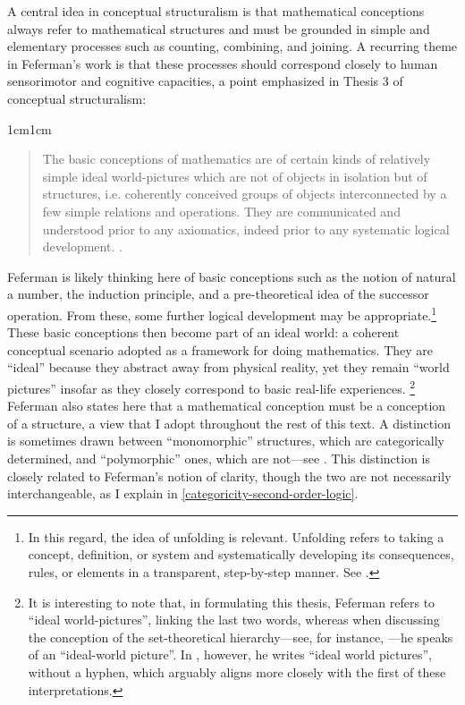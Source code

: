 \documentclass[11pt,a4paper]{article}
\theoremstyle{plain}
\begin{document}
A central idea in conceptual structuralism is that mathematical conceptions always refer to mathematical structures and must be grounded in simple and elementary processes such as counting, combining, and joining. A recurring theme in Feferman's work is that these processes should correspond closely to human sensorimotor and cognitive capacities, a point emphasized in Thesis 3 of conceptual structuralism:

\begin{adjustwidth}{1cm}{1cm}
\begin{quote}
\small
The basic conceptions of mathematics are of certain kinds of relatively simple ideal world-pictures which are not of objects in isolation but of structures, i.e. coherently conceived groups of objects interconnected by a few simple relations and operations. They are communicated and understood prior to any axiomatics, indeed prior to any systematic logical development. \parencite[p. 11]{Feferman2011a}.
\end{quote}
\end{adjustwidth}

Feferman is likely thinking here of basic conceptions such as the notion of natural a number, the induction principle, and a pre-theoretical idea of the successor operation. From these, some further logical development may be appropriate.\footnote{In this regard, the idea of unfolding is relevant. Unfolding refers to taking a concept, definition, or system and systematically developing its consequences, rules, or elements in a transparent, step-by-step manner. See \textcite{FefermanStrahm2000}.} These basic conceptions then become part of an ideal world: a coherent conceptual scenario adopted as a framework for doing mathematics. They are “ideal” because they abstract away from physical reality, yet they remain “world pictures” insofar as they closely correspond to basic real-life experiences. \footnote{It is interesting to note that, in formulating this thesis, Feferman refers to “ideal world-pictures”, linking the last two words, whereas when discussing the conception of the set-theoretical hierarchy—see, for instance, \textcite[p.~19]{Feferman2011a}—he speaks of an “ideal-world picture”. In \textcite[p.~19]{Feferman2011b}, however, he writes “ideal world pictures”, without a hyphen, which arguably aligns more closely with the first of these interpretations.} Feferman also states here that a mathematical conception must be a conception of a structure, a view that I adopt throughout the rest of this text. A distinction is sometimes drawn between “monomorphic” structures, which are categorically determined, and “polymorphic” ones, which are not—see \textcite[133]{Ferreiros2023ConStructuralism}. This distinction is closely related to Feferman's notion of clarity, though the two are not necessarily interchangeable, as I explain in \ref{categoricity-second-order-logic}.
\end{document}
